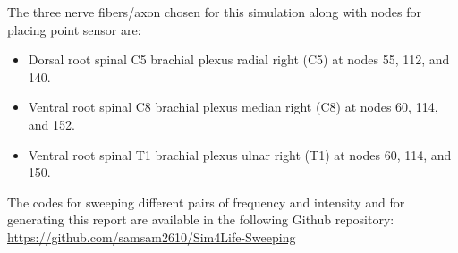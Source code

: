 \documentclass[letterpaper,12pt]{article}
\begin{document}
\noindent The three nerve fibers/axon chosen for this simulation along with nodes for placing point sensor are:
\begin{itemize}
    \item Dorsal root spinal C5 brachial plexus radial right (C5) at nodes 55, 112, and 140.
    \item Ventral root spinal C8 brachial plexus median right (C8) at nodes 60, 114, and 152.
    \item Ventral root spinal T1 brachial plexus ulnar right (T1) at nodes 60, 114, and 150.
\end{itemize}

\noindent The codes for sweeping different pairs of frequency and intensity and for generating this report are available in the following Github repository: \url{https://github.com/samsam2610/Sim4Life-Sweeping}
\end{document}
